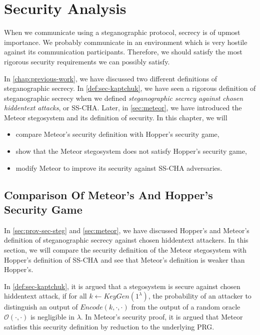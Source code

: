 \chapter{Security Analysis}
\label{chap:security}

When we communicate using a steganographic protocol, secrecy is of upmost importance.
We probably communicate in an environment which is very hostile against its communication participants.
Therefore, we should satisfy the most rigorous security requirements we can possibly satisfy.

In \autoref{chap:previous-work}, we have discussed two different definitions of steganographic secrecy.
In \autoref{def:sec-kaptchuk}, we have seen a rigorous definition of steganographic secrecy when we defined \emph{steganographic secrecy against chosen hiddentext attacks}, or SS-CHA.
Later, in \autoref{sec:meteor}, we have introduced the Meteor stegosystem and its definition of security.
In this chapter, we will
\begin{itemize}
	\item compare Meteor's security definition with Hopper's security game,
	\item show that the Meteor stegosystem does not satisfy Hopper's security game,
	\item modify Meteor to improve its security against SS-CHA adversaries.
\end{itemize}

\section{Comparison Of Meteor's And Hopper's Security Game}

In \autoref{sec:prov-sec-steg} and \autoref{sec:meteor}, we have discussed Hopper's and Meteor's definition of steganographic secrecy against chosen hiddentext attackers. 
In this section, we will compare the security definition of the Meteor stegosystem with Hopper's definition of SS-CHA and see that Meteor's definition is weaker than Hopper's.

In \autoref{def:sec-kaptchuk}, it is argued that a stegosystem is secure against chosen hiddentext attack, if for all $k \leftarrow KeyGen(1^\lambda)$, the probability of an attacker to distinguish an output of $Encode(k, \cdot, \cdot)$ from the output of a random oracle $\mathcal{O}(\cdot, \cdot)$ is negligible in $\lambda$. In Meteor's security proof, it is argued that Meteor satisfies this security definition by reduction to the underlying PRG.

